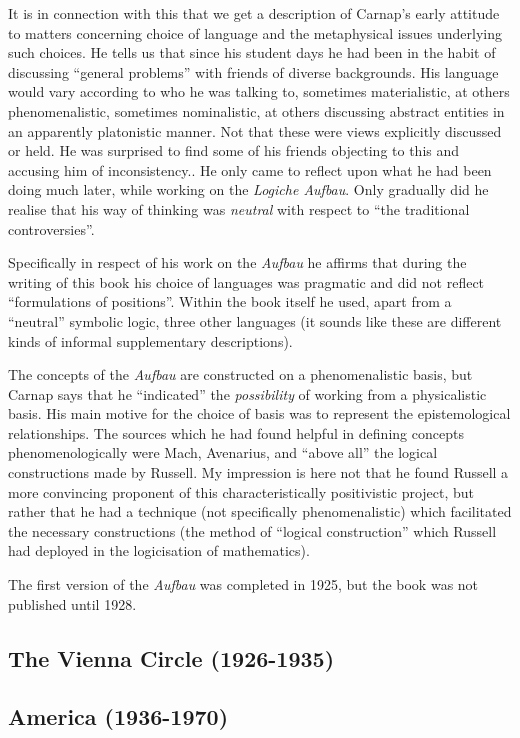\documentclass[10pt,titlepage]{book}
\begin{document}
It is in connection with this that we get a description of Carnap's early attitude to matters concerning choice of language and the metaphysical issues underlying such choices. 
He tells us that since his student days he had been in the habit of discussing ``general problems'' with friends of diverse backgrounds.
His language would vary according to who he was talking to, sometimes materialistic, at others phenomenalistic, sometimes nominalistic, at others discussing abstract entities in an apparently platonistic manner.
Not that these were views explicitly discussed or held.
He was surprised to find some of his friends objecting to this and accusing him of inconsistency..
He only came to reflect upon what he had been doing much later, while working on the \emph{Logiche Aufbau}.
Only gradually did he realise that his way of thinking was \emph{neutral} with respect to ``the traditional controversies''.

Specifically in respect of his work on the \emph{Aufbau} he affirms that during the writing of this book his choice of languages was pragmatic and did not reflect ``formulations of positions''.
Within the book itself he used, apart from a ``neutral'' symbolic logic, three other languages (it sounds like these are different kinds of informal supplementary descriptions).

The concepts of the \emph{Aufbau} are constructed on a phenomenalistic basis, but Carnap says that he ``indicated'' the \emph{possibility} of working from a physicalistic basis.
His main motive for the choice of basis was to represent the epistemological relationships.
The sources which he had found helpful in defining concepts phenomenologically were Mach, Avenarius, and ``above all'' the logical constructions made by Russell.
My impression is here not that he found Russell a more convincing proponent of this characteristically positivistic project, but rather that he had a technique (not specifically phenomenalistic) which facilitated the necessary constructions (the method of ``logical construction'' which Russell had deployed in the logicisation of mathematics).

The first version of the \emph{Aufbau} was completed in 1925, but the book was not published until 1928.

\subsection{The Vienna Circle (1926-1935)}

\subsection{America (1936-1970)}
\end{document}
